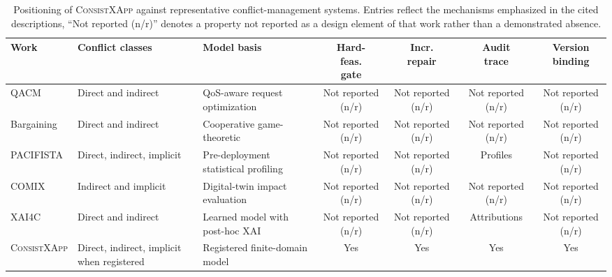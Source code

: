 \documentclass[pdflatex,sn-mathphys-num,iicol,oneside]{sn-jnl}
\newcommand{\method}{\textsc{ConsistXApp}\xspace}
\begin{document}
\begin{table}[t]
\centering
\caption{Positioning of \method against representative conflict-management
systems. Entries reflect the mechanisms emphasized in the cited
descriptions, ``Not reported (n/r)'' denotes a property not reported as a design
element of that work rather than a demonstrated absence.}
\label{tab:relatedwork}
\setlength{\tabcolsep}{3.5pt}
\footnotesize
\begin{tabular}{
  >{\raggedright\arraybackslash}p{16mm}
  >{\raggedright\arraybackslash}p{30mm}
  >{\raggedright\arraybackslash}p{29mm}
  ccc c}
\toprule
Work &
Conflict classes &
Model basis &
\shortstack{Hard-\\feas.\\gate} &
\shortstack{Incr.\\repair} &
\shortstack{Audit\\trace} &
\shortstack{Version\\binding}\\
\midrule

QACM \cite{wadud2024qacm} &
Direct and indirect &
QoS-aware request optimization &
Not reported (n/r) & Not reported (n/r) & Not reported (n/r) & Not reported (n/r)\\

Bargaining \cite{wadud2023game} &
Direct and indirect &
Cooperative game-theoretic &
Not reported (n/r) & Not reported (n/r) & Not reported (n/r) & Not reported (n/r)\\

PACIFISTA \cite{prever2025pacifista} &
Direct, indirect, implicit &
Pre-deployment statistical profiling &
Not reported (n/r) & Not reported (n/r) & Profiles & Not reported (n/r)\\

COMIX \cite{giannopoulos2025comix} &
Indirect and implicit &
Digital-twin impact evaluation &
Not reported (n/r) & Not reported (n/r) & Not reported (n/r) & Not reported (n/r)\\

XAI4C \cite{varshney2025xai4c} &
Direct and indirect &
Learned model with post-hoc XAI &
Not reported (n/r) & Not reported (n/r) & Attributions & Not reported (n/r)\\

\midrule
\method &
Direct, indirect, implicit when registered &
Registered finite-domain model &
Yes & Yes & Yes & Yes\\

\bottomrule
\end{tabular}
\end{table}
\end{document}
